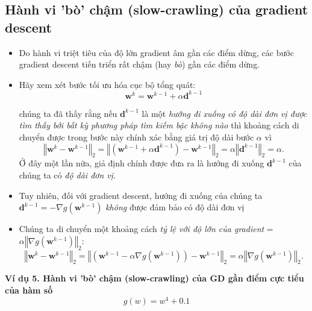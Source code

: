 \documentclass{book}
\begin{document}
\subsection{Hành vi 'bò' chậm (slow-crawling) của gradient descent}
\begin{itemize}
    \item Do hành vi triệt tiêu của độ lớn gradient âm gần các điểm dừng, các bước gradient descent tiến triển rất chậm (hay \textit{bò}) gần các điểm dừng.
    \item Hãy xem xét bước tối ưu hóa cục bộ tổng quát:
    \begin{equation*}
        \mathbf{w}^k = \mathbf{w}^{k-1} + \alpha \mathbf{d}^{k-1}
    \end{equation*}
    
    chúng ta đã thấy rằng nếu $\mathbf{d}^{k-1}$ là một \textit{hướng đi xuống có độ dài đơn vị được tìm thấy bởi bất kỳ phương pháp tìm kiếm bậc không nào} thì khoảng cách di chuyển được trong bước này chính xác bằng giá trị độ dài bước $\alpha$ vì
    \begin{equation*}
        \left\Vert \mathbf{w}^k - \mathbf{w}^{k-1} \right\Vert_2 = \left\Vert \left(\mathbf{w}^{k-1} + \alpha \mathbf{d}^{k-1}\right) - \mathbf{w}^{k-1} \right\Vert_2 = \alpha \left\Vert \mathbf{d}^{k-1} \right\Vert_2 = \alpha.
    \end{equation*}
    Ở đây một lần nữa, giả định chính được đưa ra là hướng đi xuống $\mathbf{d}^{k-1}$ của chúng ta có \textit{độ dài đơn vị}. 

    \item Tuy nhiên, đối với gradient descent, hướng đi xuống của chúng ta $\mathbf{d}^{k-1} = -\nabla g\left(\mathbf{w}^{k-1}\right)$ \textit{không} được đảm bảo có độ dài đơn vị

    \item Chúng ta di chuyển một khoảng cách \textit{tỷ lệ với độ lớn của gradient} = $\alpha \left\Vert \nabla g\left(\mathbf{w}^{k-1}\right) \right\Vert_2$:
    \begin{equation*}
        \left\Vert \mathbf{w}^k - \mathbf{w}^{k-1} \right\Vert_2 =  \left\Vert \left(\mathbf{w}^{k-1} - \alpha\nabla g\left(\mathbf{w}^{k-1}\right) \right) - \mathbf{w}^{k-1} \right\Vert_2  = \alpha \left\Vert \nabla g\left(\mathbf{w}^{k-1}\right) \right\Vert_2.
    \end{equation*}
\end{itemize}
\textbf{Ví dụ 5. Hành vi 'bò' chậm (slow-crawling) của GD gần điểm cực tiểu của hàm số}
\begin{equation*}
    g(w) = w^4 + 0.1
\end{equation*}
\end{document}
